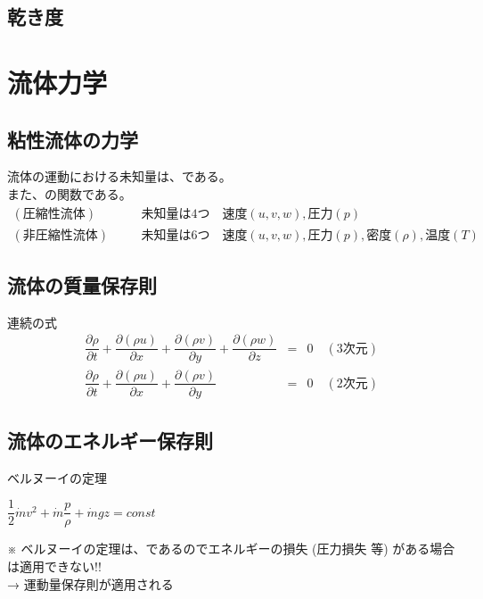 \documentclass[a4paper]{jsarticle}
\begin{document}
\subsection{乾き度}
\newpage
\section{流体力学}
\subsection{粘性流体の力学}
流体の運動における未知量は、である。\\
また、の関数である。\\
\begin{eqnarray*}
    (圧縮性流体)&&\quad 未知量は4つ\quad 速度\left(u,v,w\right),圧力\left(p\right)\\
    (非圧縮性流体)&&\quad 未知量は6つ\quad 速度\left(u,v,w\right),圧力\left(p\right),密度\left(\rho\right),温度\left(T\right)
\end{eqnarray*}
\subsection{流体の質量保存則}
\begin{itembox}[l]{連続の式}
    \begin{eqnarray*}
        \dfrac{\partial\rho}{\partial t}+\dfrac{\partial \left(\rho u\right)}{\partial x}+\dfrac{\partial \left(\rho v\right)}{\partial y}+\dfrac{\partial \left(\rho w\right)}{\partial z}&=&0\quad(3次元)\\
        \dfrac{\partial\rho}{\partial t}+\dfrac{\partial \left(\rho u\right)}{\partial x}+\dfrac{\partial \left(\rho v\right)}{\partial y}&=&0\quad(2次元)
    \end{eqnarray*}
\end{itembox}
\subsection{流体のエネルギー保存則}
\begin{itembox}[l]{ベルヌーイの定理}
    \begin{center}
        $\dfrac{1}{2}\dot{m}v^2+\dot{m}\dfrac{p}{\rho}+\dot{m}gz=const$
    \end{center}
\end{itembox}
※ ベルヌーイの定理は、であるのでエネルギーの損失 (圧力損失 等) がある場合は適用できない!!\\
→ 運動量保存則が適用される
\end{document}
